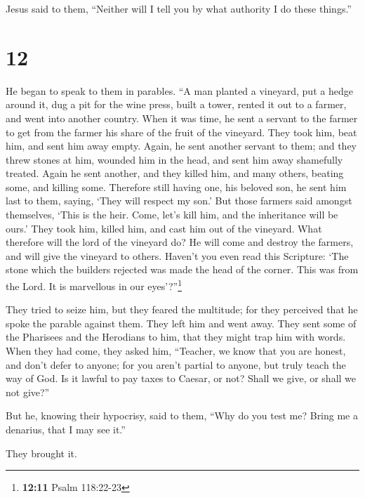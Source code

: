 Jesus said to them, ``Neither will I tell you by what authority I do
these things.''

\hypertarget{section-11}{%
\section{12}\label{section-11}}

 He began to speak to them in parables. ``A man planted a
vineyard, put a hedge around it, dug a pit for the wine press, built a
tower, rented it out to a farmer, and went into another country.
 When it was time, he sent a servant to the farmer to get
from the farmer his share of the fruit of the vineyard. 
They took him, beat him, and sent him away empty.  Again,
he sent another servant to them; and they threw stones at him, wounded
him in the head, and sent him away shamefully treated. 
Again he sent another, and they killed him, and many others, beating
some, and killing some.  Therefore still having one, his
beloved son, he sent him last to them, saying, `They will respect my
son.'  But those farmers said amongst themselves, `This is
the heir. Come, let's kill him, and the inheritance will be ours.'
 They took him, killed him, and cast him out of the
vineyard.  What therefore will the lord of the vineyard
do? He will come and destroy the farmers, and will give the vineyard to
others.  Haven't you even read this Scripture: `The stone
which the builders rejected was made the head of the corner.
 This was from the Lord. It is marvellous in our
eyes'?''\footnote{\textbf{12:11} Psalm 118:22-23}

 They tried to seize him, but they feared the multitude;
for they perceived that he spoke the parable against them. They left him
and went away.  They sent some of the Pharisees and the
Herodians to him, that they might trap him with words. 
When they had come, they asked him, ``Teacher, we know that you are
honest, and don't defer to anyone; for you aren't partial to anyone, but
truly teach the way of God. Is it lawful to pay taxes to Caesar, or not?
 Shall we give, or shall we not give?''

But he, knowing their hypocrisy, said to them, ``Why do you test me?
Bring me a denarius, that I may see it.''

 They brought it.

